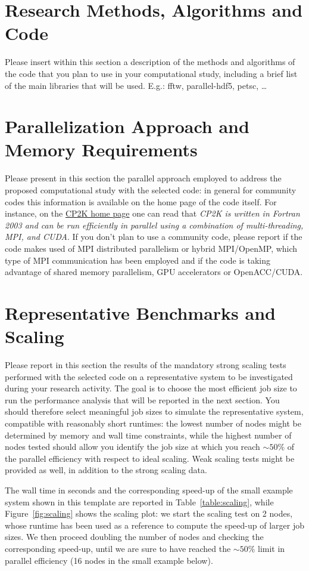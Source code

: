 \documentclass[11pt]{article}
\begin{document}
\section{Research Methods, Algorithms and Code}
Please insert within this section a description of the methods and algorithms of the code that you plan to use in your computational study, 
including a brief list of the main libraries that will be used. E.g.: fftw, parallel-hdf5, petsc, \ldots

\section{Parallelization Approach and Memory Requirements}
Please present in this section the parallel approach employed to address the proposed computational study with the selected code: 
in general for community codes this information is available on the home page of the code itself.
For instance, on the \href{www.cp2k.org}{CP2K home page} one can read that \emph{CP2K is written in Fortran 2003 and can be run 
efficiently in parallel using a combination of multi-threading, MPI, and CUDA}.
If you don't plan to use a community code, please report if the code makes used of MPI distributed parallelism or hybrid MPI/OpenMP, 
which type of MPI communication has been employed and if the code is taking advantage of shared memory parallelism, 
GPU accelerators or OpenACC/CUDA.

\section{Representative Benchmarks and Scaling}
Please report in this section the results of the mandatory strong scaling tests performed with the selected code on a representative system 
to be investigated during your research activity. 
The goal is to choose the most efficient job size to run the performance analysis that will be reported in the next section. 
You should therefore select meaningful job sizes to simulate the representative system, compatible with reasonably short runtimes: 
the lowest number of nodes might be determined by memory and wall time constraints, while the highest number of nodes tested 
should allow you identify the job size at which you reach $\sim 50\%$ of the parallel efficiency with respect to ideal scaling. 
Weak scaling tests might be provided as well, in addition to the strong scaling data. 

The wall time in seconds and the corresponding speed-up of the small example system shown in this template are reported 
in Table~\ref{table:scaling}, while Figure~\ref{fig:scaling} shows the scaling plot: we start the scaling test 
on 2 nodes, whose runtime has been used as a reference to compute the speed-up of larger job sizes. 
We then proceed doubling the number of nodes and checking the corresponding speed-up, until we are sure to have reached the $\sim 50\%$ 
limit in parallel efficiency (16 nodes in the small example below).
\end{document}
